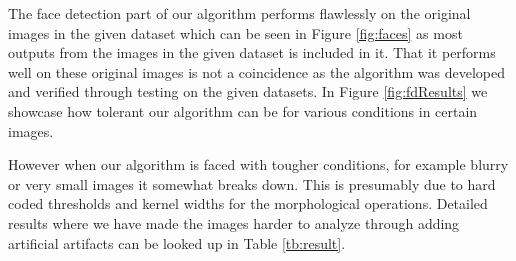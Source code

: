 
The face detection part of our algorithm performs flawlessly on the original images in the given dataset which can be seen in Figure \ref{fig:faces} as most outputs from the images in the given dataset is included in it. That it performs well on these original images is not a coincidence as the algorithm was developed and verified through testing on the given datasets. In Figure \ref{fig:fdResults} we showcase how tolerant our algorithm can be for various conditions in certain images.



However when our algorithm is faced with tougher conditions, for example blurry  or very small images it somewhat breaks down. This is presumably due to hard coded thresholds and kernel widths for the morphological operations. Detailed results where we have made the images harder to analyze through adding artificial artifacts can be looked up in Table \ref{tb:result}.





